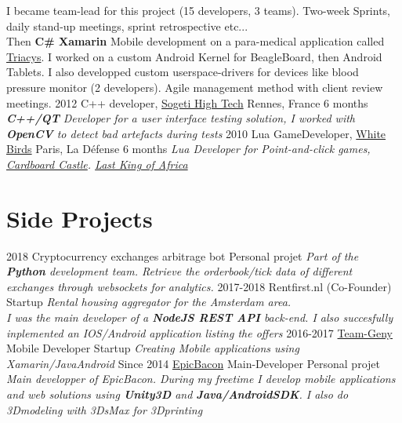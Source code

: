 \documentclass{emonides-cv}
\begin{document}
\begin{entrylist}
{{    I became team-lead for this project (15 developers, 3 teams). Two-week Sprints, daily stand-up meetings, sprint retrospective etc...
    \\Then \textbf{C\# Xamarin} Mobile development on a para-medical application called \href{http://www.triacys.com/}{Triacys}.
    I worked on a custom Android Kernel for BeagleBoard, then Android Tablets. I also developped custom userspace-drivers for devices like blood pressure monitor
    (2 developers). Agile management method with client review meetings. }}
  \entry
    {2012}
    {C++ developer, \href{https://www.acensi.fr/}{Sogeti High Tech} {\normalfont Rennes, France}}
    {6 months}
    {\emph{\textbf{C++/QT} Developer for a user interface testing solution, I worked with \textbf{OpenCV} to detect bad artefacts during tests }}
  \entry
    {2010}
    {Lua GameDeveloper, \href{https://www.giantbomb.com/white-birds-productions/3010-5637/}{White Birds} {\normalfont Paris, La Défense}}
    {6 months}
    {\emph{Lua Developer for Point-and-click games, \href{https://www.bigfishgames.com/games/6859/cardboard-castle/}{Cardboard Castle}. \href{https://www.wikiwand.com/fr/White_Birds_Productions}{Last King of Africa}}}
\end{entrylist}

\vspace{1cm}

\section{Side Projects}
\begin{entrylist}
  \entry
    {2018}
    {Cryptocurrency exchanges arbitrage bot {\normalfont }}
    {Personal projet}
    {\emph{Part of the \textbf{Python} development team. Retrieve the orderbook/tick data of different exchanges through websockets for analytics. }}
  \entry
    {2017-2018}
    {Rentfirst.nl {\normalfont  (Co-Founder)}}
    {Startup}
    {\emph{Rental housing aggregator for the Amsterdam area. \\
    I was the main developer of a \textbf{NodeJS REST API} back-end.
    I also succesfully inplemented an IOS/Android application listing the offers}}
  \entry
    {2016-2017}
    {\href{http://www.teamgeny.com/}{Team-Geny} {\normalfont Mobile Developer}}
    {Startup}
    {\emph{Creating Mobile applications using Xamarin/JavaAndroid}}
  \entry
    {Since 2014}
    {\href{https://play.google.com/store/apps/developer?id=EpicBacon}{EpicBacon} {\normalfont Main-Developer}}
    {Personal projet}
    {\emph{Main developper of EpicBacon. During my freetime I develop mobile applications and web solutions using \textbf{Unity3D} and \textbf{Java/AndroidSDK}.
    I also do 3Dmodeling with 3DsMax for 3Dprinting  }}
\end{entrylist}
\end{document}

